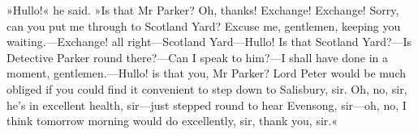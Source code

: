 »Hullo!« he said. »Is that Mr Parker? Oh, thanks! Exchange! Exchange! Sorry, can you put me through to Scotland Yard? Excuse me, gentlemen, keeping you waiting.---Exchange! all right—Scotland Yard—Hullo! Is that Scotland Yard?---Is Detective Parker round there?---Can I speak to him?---I shall have done in a moment, gentlemen.---Hullo! is that you, Mr Parker? Lord Peter would be much obliged if you could find it convenient to step down to Salisbury, sir. Oh, no, sir, he's in excellent health, sir—just stepped round to hear Evensong, sir—oh, no, I think tomorrow morning would do excellently, sir, thank you, sir.«